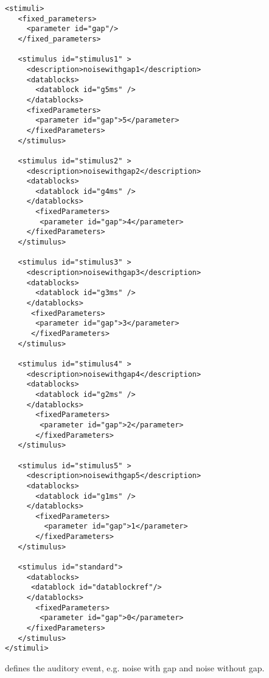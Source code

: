 \begin{lstlisting}
<stimuli>
   <fixed_parameters>
     <parameter id="gap"/>
   </fixed_parameters>

   <stimulus id="stimulus1" >
     <description>noisewithgap1</description>
     <datablocks>
       <datablock id="g5ms" />
     </datablocks>
     <fixedParameters>
       <parameter id="gap">5</parameter>
     </fixedParameters>
   </stimulus>

   <stimulus id="stimulus2" >
     <description>noisewithgap2</description>
     <datablocks>
       <datablock id="g4ms" />
     </datablocks>
       <fixedParameters>
        <parameter id="gap">4</parameter>
     </fixedParameters>
   </stimulus>

   <stimulus id="stimulus3" >
     <description>noisewithgap3</description>
     <datablocks>
       <datablock id="g3ms" />
     </datablocks>
      <fixedParameters>
       <parameter id="gap">3</parameter>
      </fixedParameters>
   </stimulus>

   <stimulus id="stimulus4" >
     <description>noisewithgap4</description>
     <datablocks>
       <datablock id="g2ms" />
     </datablocks>
       <fixedParameters>
        <parameter id="gap">2</parameter>
       </fixedParameters>
   </stimulus>

   <stimulus id="stimulus5" >
     <description>noisewithgap5</description>
     <datablocks>
       <datablock id="g1ms" />
     </datablocks>
       <fixedParameters>
         <parameter id="gap">1</parameter>
       </fixedParameters>
   </stimulus>

   <stimulus id="standard">
     <datablocks>
      <datablock id="datablockref"/>
     </datablocks>
       <fixedParameters>
        <parameter id="gap">0</parameter>
     </fixedParameters>
   </stimulus>
</stimuli>
\end{lstlisting}


 defines the auditory event, e.g. noise with gap
and noise without gap.

